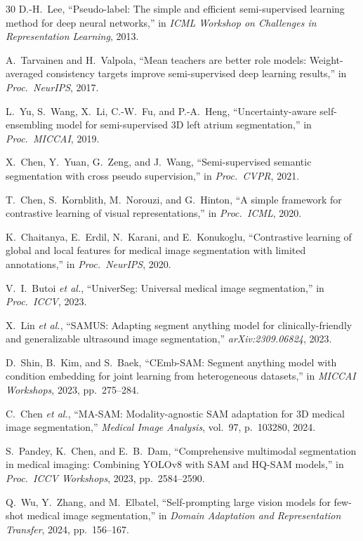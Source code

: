 \documentclass[journal,11pt,onecolumn,draftclsnofoot]{IEEEtran}
\begin{document}
\begin{thebibliography}{30}
D.-H.~Lee, ``Pseudo-label: The simple and efficient semi-supervised learning method for deep neural networks,'' in \emph{ICML Workshop on Challenges in Representation Learning}, 2013.

A.~Tarvainen and H.~Valpola, ``Mean teachers are better role models: Weight-averaged consistency targets improve semi-supervised deep learning results,'' in \emph{Proc.\ NeurIPS}, 2017.

L.~Yu, S.~Wang, X.~Li, C.-W.~Fu, and P.-A.~Heng, ``Uncertainty-aware self-ensembling model for semi-supervised 3D left atrium segmentation,'' in \emph{Proc.\ MICCAI}, 2019.

X.~Chen, Y.~Yuan, G.~Zeng, and J.~Wang, ``Semi-supervised semantic segmentation with cross pseudo supervision,'' in \emph{Proc.\ CVPR}, 2021.

T.~Chen, S.~Kornblith, M.~Norouzi, and G.~Hinton, ``A simple framework for contrastive learning of visual representations,'' in \emph{Proc.\ ICML}, 2020.

K.~Chaitanya, E.~Erdil, N.~Karani, and E.~Konukoglu, ``Contrastive learning of global and local features for medical image segmentation with limited annotations,'' in \emph{Proc.\ NeurIPS}, 2020.

V.~I.~Butoi \emph{et al.}, ``UniverSeg: Universal medical image segmentation,'' in \emph{Proc.\ ICCV}, 2023.

X.~Lin \emph{et al.}, ``SAMUS: Adapting segment anything model for clinically-friendly and generalizable ultrasound image segmentation,'' \emph{arXiv:2309.06824}, 2023.

D.~Shin, B.~Kim, and S.~Baek, ``CEmb-SAM: Segment anything model with condition embedding for joint learning from heterogeneous datasets,'' in \emph{MICCAI Workshops}, 2023, pp.~275--284.

C.~Chen \emph{et al.}, ``MA-SAM: Modality-agnostic SAM adaptation for 3D medical image segmentation,'' \emph{Medical Image Analysis}, vol.~97, p.~103280, 2024.

S.~Pandey, K.~Chen, and E.~B.~Dam, ``Comprehensive multimodal segmentation in medical imaging: Combining YOLOv8 with SAM and HQ-SAM models,'' in \emph{Proc.\ ICCV Workshops}, 2023, pp.~2584--2590.

Q.~Wu, Y.~Zhang, and M.~Elbatel, ``Self-prompting large vision models for few-shot medical image segmentation,'' in \emph{Domain Adaptation and Representation Transfer}, 2024, pp.~156--167.


\end{thebibliography}
\end{document}
